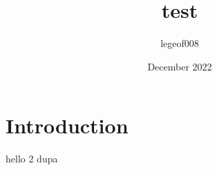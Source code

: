 \documentclass{article}
\title{test}
\author{legeof008 }
\date{December 2022}
\begin{document}
\maketitle

\section{Introduction}
hello 2 dupa
\end{document}
